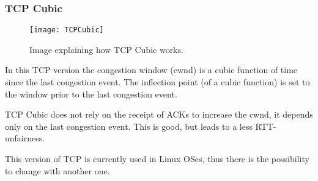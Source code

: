 \subsubsection{TCP Cubic}

\begin{figure}[t]
  \centering
  \texttt{[image: TCPCubic]}
  \caption{Image explaining how TCP Cubic works.}
\end{figure}

In this TCP version the congestion window (cwnd) is a cubic function of time
since the last congestion event.
The inflection point (of a cubic function) is set to the window prior to the
last congestion event.

TCP Cubic does not rely on the receipt of ACKs to increase the cwnd, it
depends only on the last congestion event. This is good, but leads to a less
RTT-unfairness.

This version of TCP is currently used in Linux OSes, thus there is the
possibility to change with another one.
